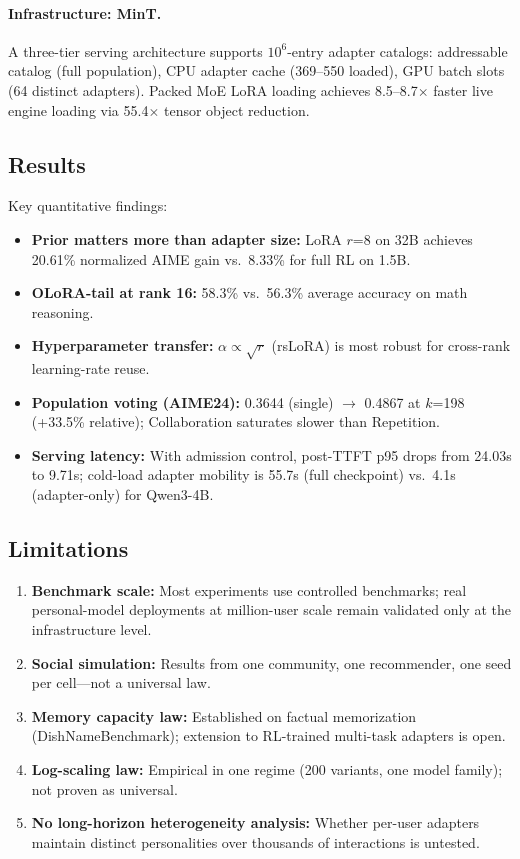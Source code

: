 \documentclass[11pt,a4paper]{article}
\begin{document}
\paragraph{Infrastructure: MinT.} A three-tier serving architecture supports $10^6$-entry adapter catalogs: addressable catalog (full population), CPU adapter cache (369--550 loaded), GPU batch slots (64 distinct adapters). Packed MoE LoRA loading achieves 8.5--8.7$\times$ faster live engine loading via 55.4$\times$ tensor object reduction.

\subsection{Results}

Key quantitative findings:
\begin{itemize}
\item \textbf{Prior matters more than adapter size:} LoRA $r$=8 on 32B achieves 20.61\% normalized AIME gain vs.\ 8.33\% for full RL on 1.5B.
\item \textbf{OLoRA-tail at rank 16:} 58.3\% vs.\ 56.3\% average accuracy on math reasoning.
\item \textbf{Hyperparameter transfer:} $\alpha \propto \sqrt{r}$ (rsLoRA) is most robust for cross-rank learning-rate reuse.
\item \textbf{Population voting (AIME24):} 0.3644 (single) $\to$ 0.4867 at $k$=198 (+33.5\% relative); Collaboration saturates slower than Repetition.
\item \textbf{Serving latency:} With admission control, post-TTFT p95 drops from 24.03s to 9.71s; cold-load adapter mobility is 55.7s (full checkpoint) vs.\ 4.1s (adapter-only) for Qwen3-4B.
\end{itemize}

\subsection{Limitations}

\begin{enumerate}
\item \textbf{Benchmark scale:} Most experiments use controlled benchmarks; real personal-model deployments at million-user scale remain validated only at the infrastructure level.
\item \textbf{Social simulation:} Results from one community, one recommender, one seed per cell---not a universal law.
\item \textbf{Memory capacity law:} Established on factual memorization (DishNameBenchmark); extension to RL-trained multi-task adapters is open.
\item \textbf{Log-scaling law:} Empirical in one regime (200 variants, one model family); not proven as universal.
\item \textbf{No long-horizon heterogeneity analysis:} Whether per-user adapters maintain distinct personalities over thousands of interactions is untested.
\end{enumerate}
\end{document}
